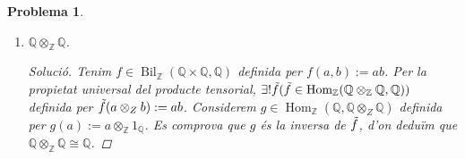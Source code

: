 \documentclass[compress]{article}
\newtheorem{problema}{Problema}
\theoremstyle{definition}
\DeclareMathOperator{\Hom}{Hom}
\DeclareMathOperator{\Bil}{Bil}
\begin{document}
\begin{problema}
\begin{enumerate}
\begin{proof}[Solució]
\begin{equation*}
\begin{tikzcd}
                \arrow{r}
                &0
            \end{tikzcd}
            \end{equation*}
            on $f'(\frac{a}{b})=n\frac{a}{b}$. Fixem-nos que $f'$ és un isomorfisme, d'on, per exactitud, deduïm que $\mathbb{Z}/(n)\otimes_{\mathbb{Z}}\mathbb{Q}=0$.
        \end{proof}
        \item $\mathbb{Q}\otimes_{\mathbb{Z}}\mathbb{Q}$.
        \begin{proof}[Solució]
            Tenim $f\in\Bil_{\mathbb{Z}}(\mathbb{Q}\times\mathbb{Q},\mathbb{Q})$ definida per $f(a,b):=ab$. Per la propietat universal del producte tensorial, $\exists!\Tilde{f}(\Tilde{f}\in\Hom_{\mathbb{Z}}(\mathbb{Q}\otimes_{\mathbb{Z}}\mathbb{Q},\mathbb{Q}))$ definida per $\Tilde{f}(a\otimes_{Z}b):=ab$. Considerem $g\in\Hom_{\mathbb{Z}}(\mathbb{Q},\mathbb{Q}\otimes_{Z}\mathbb{Q})$ definida per $g(a):=a\otimes_{\mathbb{Z}}1_{\mathbb{Q}}$. Es comprova que $g$ és la inversa de $\Tilde{f}$, d'on deduïm que $\mathbb{Q}\otimes_{\mathbb{Z}}\mathbb{Q}\cong\mathbb{Q}$.
        \end{proof}
    \end{enumerate}
\end{problema}
\end{document}
